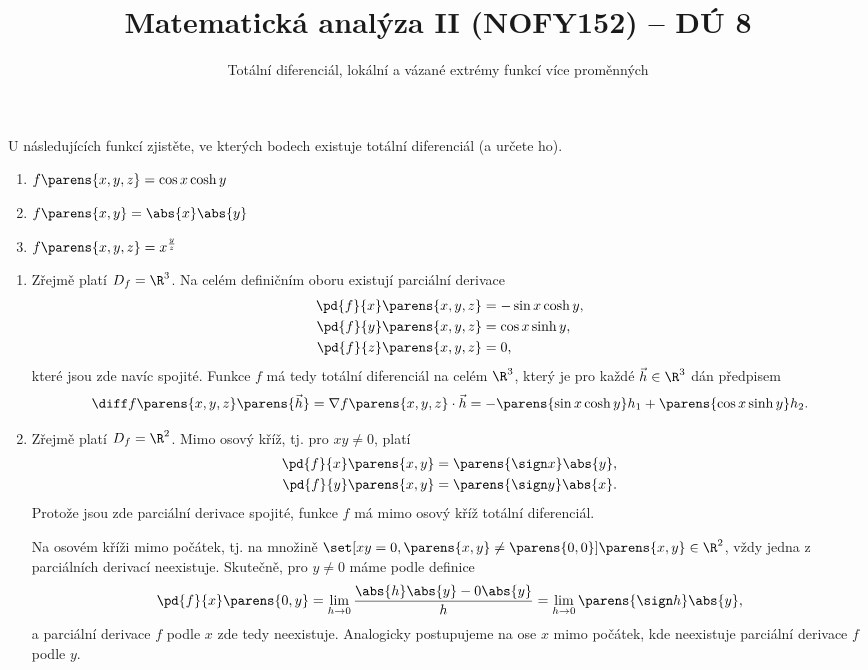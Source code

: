 \documentclass[answers]{exam}
\title{\vspace{-3ex}Matematická analýza II (NOFY152) – DÚ 8}
\author{Totální diferenciál, lokální a vázané extrémy funkcí více proměnných}
\date{\vspace{-5ex}}
\begin{document}
\maketitle

\begin{questions}	
  \question U následujících funkcí zjistěte, ve kterých bodech existuje totální diferenciál (a určete ho).
	\begin{enumerate}[label=(\roman*)]
		\item $f\parens{x, y, z} = \cos x \cosh y$
		\item $f\parens{x, y} = \abs{x} \abs{y}$
		\item $f\parens{x, y, z} = x^{\frac{y}{z}}$
	\end{enumerate}
	
  \begin{solution}
	\begin{enumerate}[label=(\roman*)]
		\item 
		
			Zřejmě platí $D_f = \R^3$. Na celém definičním oboru existují parciální derivace
			\begin{align*}
				\pd{f}{x}\parens{x,y,z} &= - \sin x \cosh y,
				\\
				\pd{f}{y}\parens{x,y,z} &= \cos x \sinh y,
				\\
				\pd{f}{z}\parens{x,y,z} &= 0,
			\end{align*}
			které jsou zde navíc spojité. Funkce $f$ má tedy totální diferenciál na celém $\R^3$, který je pro každé $\vec{h} \in \R^3$ dán předpisem
			\begin{equation*}
				\diff f \parens{x, y, z} \parens{\vec{h}}
				=
				\nabla f \parens{x,y,z} \cdot \vec{h}
				=
				- 
				\parens{\sin x \cosh y} h_1
				+
				\parens{\cos x \sinh y} h_2.
			\end{equation*}
		
		\item 
		
			Zřejmě platí $D_f = \R^2$. Mimo osový kříž, tj. pro $xy \neq 0$, platí
			\begin{align*}
				\pd{f}{x}\parens{x,y} &= \parens{\sign x} \abs{y},
				\\
				\pd{f}{y}\parens{x,y} &= \parens{\sign y} \abs{x}.
			\end{align*}
			Protože jsou zde parciální derivace spojité, funkce $f$ má mimo osový kříž totální diferenciál.
			
			Na osovém kříži mimo počátek, tj. na množině $\set[xy = 0, \parens{x, y} \neq \parens{0, 0}]{\parens{x,y} \in \R^2}$, vždy jedna z parciálních derivací neexistuje. Skutečně, pro $y \neq 0$ máme podle definice
			\begin{equation*}
				\pd{f}{x}\parens{0, y} 
				= 
				\lim_{h \to 0} \frac{\abs{h} \abs{y} - 0 \abs{y}}{h}
				=
				\lim_{h \to 0} \parens{\sign h} \abs{y},
			\end{equation*}
			a parciální derivace $f$ podle $x$ zde tedy neexistuje. Analogicky postupujeme na ose $x$ mimo počátek, kde neexistuje parciální derivace $f$ podle $y$.
			

\end{enumerate}
\end{solution}
\end{questions}
\end{document}
